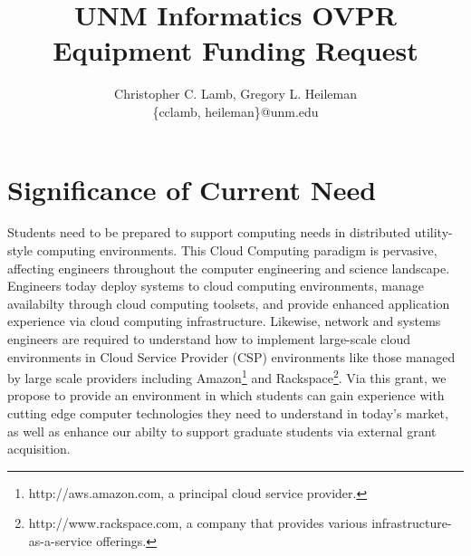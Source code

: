 \documentclass[12pt,letterpaper]{article}
\author{Christopher C. Lamb, Gregory L. Heileman \\
{\small \{cclamb, heileman\}@unm.edu}}
\title{UNM Informatics OVPR Equipment Funding Request}
\date{}
\begin{document}
\maketitle


\section{Significance of Current Need}
Students need to be prepared to support computing needs in distributed utility-style computing environments. This Cloud Computing paradigm is pervasive, affecting engineers throughout the computer engineering and science landscape. Engineers today deploy systems to cloud computing environments, manage availabilty through cloud computing toolsets, and provide enhanced application experience via cloud computing infrastructure. Likewise, network and systems engineers are required to understand how to implement large-scale cloud environments in Cloud Service Provider (CSP) environments like those managed by large scale providers including Amazon\footnote{http://aws.amazon.com, a principal cloud service provider.} and Rackspace\footnote{http://www.rackspace.com, a company that provides various infrastructure-as-a-service offerings.}. Via this grant, we propose to provide an environment in which students can gain experience with cutting edge computer technologies they need to understand in today's market, as well as enhance our abilty to support graduate students via external grant acquisition.
\end{document}
